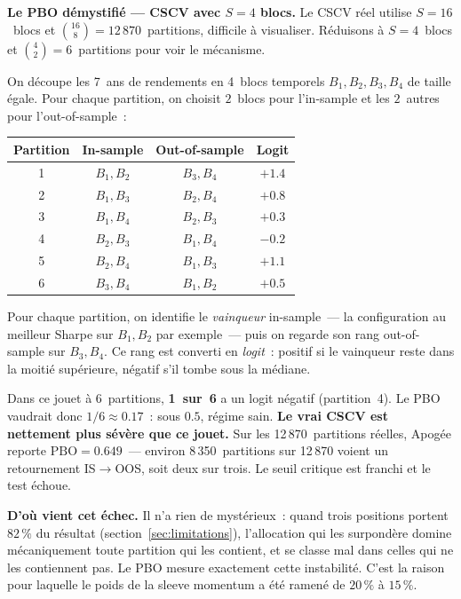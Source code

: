 \begin{examplebox}
\textbf{Le PBO démystifié --- CSCV avec $S=4$ blocs.} Le CSCV réel utilise $S=16$~blocs et $\binom{16}{8}=12\,870$~partitions, difficile à visualiser. Réduisons à $S=4$~blocs et $\binom{4}{2}=6$~partitions pour voir le mécanisme.

\smallskip
On découpe les 7~ans de rendements en 4~blocs temporels $B_{1}, B_{2}, B_{3}, B_{4}$ de taille égale. Pour chaque partition, on choisit $2$~blocs pour l'in-sample et les $2$~autres pour l'out-of-sample~:

\begin{center}\small
\begin{tabular}{c c c c}
\toprule
Partition & In-sample & Out-of-sample & Logit \\
\midrule
1 & $B_{1}, B_{2}$ & $B_{3}, B_{4}$ & $+1.4$ \\
2 & $B_{1}, B_{3}$ & $B_{2}, B_{4}$ & $+0.8$ \\
3 & $B_{1}, B_{4}$ & $B_{2}, B_{3}$ & $+0.3$ \\
4 & $B_{2}, B_{3}$ & $B_{1}, B_{4}$ & $-0.2$ \\
5 & $B_{2}, B_{4}$ & $B_{1}, B_{3}$ & $+1.1$ \\
6 & $B_{3}, B_{4}$ & $B_{1}, B_{2}$ & $+0.5$ \\
\bottomrule
\end{tabular}
\end{center}

\smallskip
Pour chaque partition, on identifie le \emph{vainqueur} in-sample~--- la configuration au meilleur Sharpe sur $B_{1},B_{2}$ par exemple~--- puis on regarde son rang out-of-sample sur $B_{3},B_{4}$. Ce rang est converti en \emph{logit}~: positif si le vainqueur reste dans la moitié supérieure, négatif s'il tombe sous la médiane.

\smallskip
Dans ce jouet à 6~partitions, \textbf{1~sur~6} a un logit négatif (partition~4). Le PBO vaudrait donc $1/6 \approx 0.17$~: sous $0.5$, régime sain. \textbf{Le vrai CSCV est nettement plus sévère que ce jouet.} Sur les 12\,870~partitions réelles, Apogée reporte $\mathrm{PBO} = 0.649$~--- environ 8\,350~partitions sur 12\,870 voient un retournement IS$\to$OOS, soit deux sur trois. Le seuil critique est franchi et le test échoue.

\smallskip
\textbf{D'où vient cet échec.} Il n'a rien de mystérieux~: quand trois positions portent $82\,\%$ du résultat (section~\ref{sec:limitations}), l'allocation qui les surpondère domine mécaniquement toute partition qui les contient, et se classe mal dans celles qui ne les contiennent pas. Le PBO mesure exactement cette instabilité. C'est la raison pour laquelle le poids de la sleeve momentum a été ramené de $20\,\%$ à $15\,\%$.
\end{examplebox}

